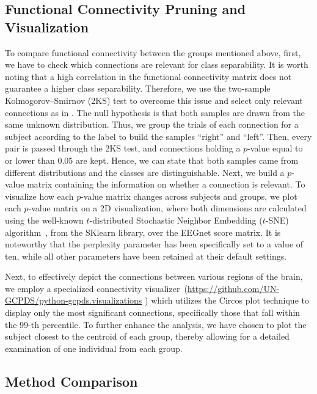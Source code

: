 	\subsection{Functional Connectivity Pruning and Visualization}
	
	To compare functional connectivity between the groups mentioned above, first, we have to check which connections are relevant for class separability. It is worth noting that a high correlation in the functional connectivity matrix does not guarantee a higher class separability. Therefore, we use the two-sample Kolmogorov–Smirnov (2KS) test to overcome this issue and select only relevant connections as in \cite{gu2020random}. The null hypothesis is that both samples are drawn from the same unknown distribution. Thus, we group the trials of each connection for a subject according to the label to build the samples ``right'' and ``left''. Then, every pair is passed through the 2KS test, and connections holding a $p$-value equal to or lower than $0.05$ are kept. Hence, we can state that both samples came from different distributions and the classes are distinguishable. Next, we build a $p$-value matrix containing the information on whether a connection is relevant. To visualize how each $p$-value matrix changes across subjects and groups, we plot each $p$-value matrix on a 2D visualization, where both dimensions are calculated using the well-known $t$-distributed Stochastic Neighbor Embedding ($t$-SNE) algorithm~\cite{van2008visualizing}, from the SKlearn library, over the EEGnet score matrix. It is noteworthy that the perplexity parameter has been specifically set to a value of ten, while all other parameters have been retained at their default settings.
	
	Next, to effectively depict the connections between various regions of the brain, we employ a specialized connectivity visualizer~(\url{https://github.com/UN-GCPDS/python-gcpds.visualizations} ) which utilizes the Circos plot technique to display only the most significant connections, specifically those that fall within the $99$-th percentile. To further enhance the analysis, we have chosen to plot the subject closest to the centroid of each group, thereby allowing for a detailed examination of one individual from each group.
	
	
	\subsection{Method Comparison}
	
